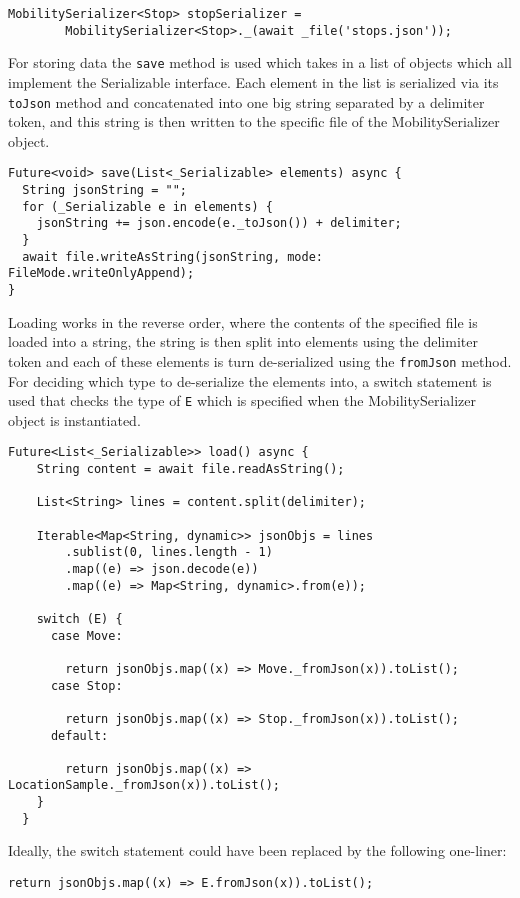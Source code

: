 \begin{verbatim}
MobilitySerializer<Stop> stopSerializer =
        MobilitySerializer<Stop>._(await _file('stops.json'));
\end{verbatim}

For storing data the \verb|save| method is used which takes in a list of objects which all implement the Serializable interface. Each element in the list is serialized via its \verb|toJson| method and concatenated into one big string separated by a delimiter token, and this string is then written to the specific file of the MobilitySerializer object.

\begin{verbatim}
Future<void> save(List<_Serializable> elements) async {
  String jsonString = "";
  for (_Serializable e in elements) {
    jsonString += json.encode(e._toJson()) + delimiter;
  }
  await file.writeAsString(jsonString, mode: FileMode.writeOnlyAppend);
}
\end{verbatim}

Loading works in the reverse order, where the contents of the specified file is loaded into a string, the string is then split into elements using the delimiter token and each of these elements is turn de-serialized using the \verb|fromJson| method.  For deciding which type to de-serialize the elements into, a switch statement is used that checks the type of \verb|E| which is specified when the MobilitySerializer object is instantiated.

\begin{verbatim}
Future<List<_Serializable>> load() async {
    String content = await file.readAsString();

    List<String> lines = content.split(delimiter);

    Iterable<Map<String, dynamic>> jsonObjs = lines
        .sublist(0, lines.length - 1)
        .map((e) => json.decode(e))
        .map((e) => Map<String, dynamic>.from(e));

    switch (E) {
      case Move:

        return jsonObjs.map((x) => Move._fromJson(x)).toList();
      case Stop:

        return jsonObjs.map((x) => Stop._fromJson(x)).toList();
      default:

        return jsonObjs.map((x) => LocationSample._fromJson(x)).toList();
    }
  }
\end{verbatim}

Ideally, the switch statement could have been replaced by the following one-liner:
\begin{verbatim}
return jsonObjs.map((x) => E.fromJson(x)).toList();
\end{verbatim}

